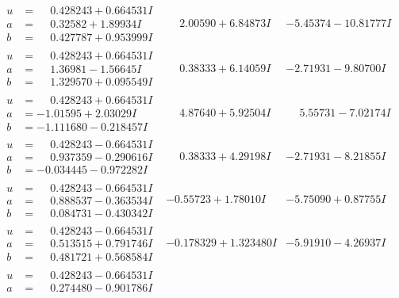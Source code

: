 \documentclass[1p]{elsarticle_modified}
\theoremstyle{definition}
\begin{document}
$$\begin{array}{c|c|c}
\begin{aligned}
u &= \phantom{-}0.428243 + 0.664531 I \\
a &= \phantom{-}0.32582 + 1.89934 I \\
b &= \phantom{-}0.427787 + 0.953999 I\end{aligned}
 & \phantom{-}2.00590 + 6.84873 I & -5.45374 - 10.81777 I \\ \hline\begin{aligned}
u &= \phantom{-}0.428243 + 0.664531 I \\
a &= \phantom{-}1.36981 - 1.56645 I \\
b &= \phantom{-}1.329570 + 0.095549 I\end{aligned}
 & \phantom{-}0.38333 + 6.14059 I & -2.71931 - 9.80700 I \\ \hline\begin{aligned}
u &= \phantom{-}0.428243 + 0.664531 I \\
a &= -1.01595 + 2.03029 I \\
b &= -1.111680 - 0.218457 I\end{aligned}
 & \phantom{-}4.87640 + 5.92504 I & \phantom{-}5.55731 - 7.02174 I \\ \hline\begin{aligned}
u &= \phantom{-}0.428243 - 0.664531 I \\
a &= \phantom{-}0.937359 - 0.290616 I \\
b &= -0.034445 - 0.972282 I\end{aligned}
 & \phantom{-}0.38333 + 4.29198 I & -2.71931 - 8.21855 I \\ \hline\begin{aligned}
u &= \phantom{-}0.428243 - 0.664531 I \\
a &= \phantom{-}0.888537 - 0.363534 I \\
b &= \phantom{-}0.084731 - 0.430342 I\end{aligned}
 & -0.55723 + 1.78010 I & -5.75090 + 0.87755 I \\ \hline\begin{aligned}
u &= \phantom{-}0.428243 - 0.664531 I \\
a &= \phantom{-}0.513515 + 0.791746 I \\
b &= \phantom{-}0.481721 + 0.568584 I\end{aligned}
 & -0.178329 + 1.323480 I & -5.91910 - 4.26937 I \\ \hline\begin{aligned}
u &= \phantom{-}0.428243 - 0.664531 I \\
a &= \phantom{-}0.274480 - 0.901786 I \\

\end{aligned}
\end{array}$$
\end{document}
